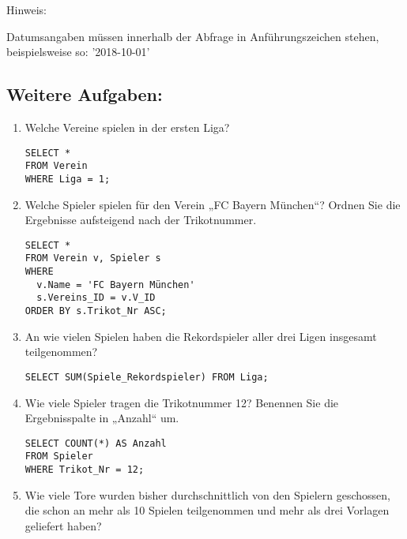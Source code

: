 \documentclass{bschlangaul-aufgabe}
\begin{document}
Hinweis:

Datumsangaben müssen innerhalb der Abfrage in Anführungszeichen stehen,
beispielsweise so: '2018-10-01'

%

\subsection{Weitere Aufgaben:}

\begin{enumerate}

%

\item Welche Vereine spielen in der ersten Liga?

\begin{verbatim}
SELECT *
FROM Verein
WHERE Liga = 1;
\end{verbatim}

%

\item Welche Spieler spielen für den Verein „FC Bayern München“? Ordnen
Sie die Ergebnisse aufsteigend nach der Trikotnummer.

\begin{verbatim}
SELECT *
FROM Verein v, Spieler s
WHERE
  v.Name = 'FC Bayern München'
  s.Vereins_ID = v.V_ID
ORDER BY s.Trikot_Nr ASC;
\end{verbatim}

%

\item An wie vielen Spielen haben die Rekordspieler aller drei Ligen
insgesamt teilgenommen?

\begin{verbatim}
SELECT SUM(Spiele_Rekordspieler) FROM Liga;
\end{verbatim}

%

\item Wie viele Spieler tragen die Trikotnummer 12? Benennen Sie die
Ergebnisspalte in „Anzahl“ um.

\begin{verbatim}
SELECT COUNT(*) AS Anzahl
FROM Spieler
WHERE Trikot_Nr = 12;
\end{verbatim}

%

\item Wie viele Tore wurden bisher durchschnittlich von den Spielern
geschossen, die schon an mehr als 10 Spielen teilgenommen und mehr als
drei Vorlagen geliefert haben?


\end{enumerate}
\end{document}

